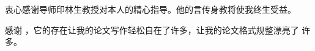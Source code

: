 \begin{acknowledgement}
  衷心感谢导师印林生教授对本人的精心指导。他的言传身教将使我终生受益。

  感谢 \thuthesis，它的存在让我的论文写作轻松自在了许多，让我的论文格式规整漂亮了
  许多。
\end{acknowledgement}
